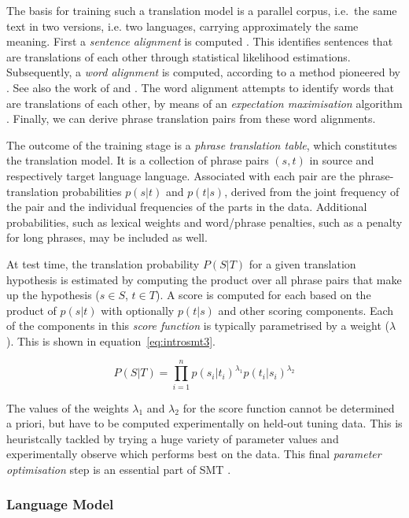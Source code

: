 The basis for training such a translation model is a parallel corpus, i.e.\ the
same text in two versions, i.e. two languages, carrying approximately the same meaning. First a \emph{sentence alignment} is computed
\citep{TIEDEMANN}. This identifies sentences that are translations of each other
through statistical likelihood estimations. Subsequently, a \emph{word alignment} is computed,
according to a method pioneered by \cite{BROWN}. See also the work of
\cite{OchNey2003} and \cite{TIEDEMANN}. The word alignment attempts to
identify words that are translations of each other, by means of an
\emph{expectation maximisation} algorithm \citep{EXPMAX}. Finally, we can derive phrase
translation pairs from these word alignments.

The outcome of the training stage is a \emph{phrase translation table}, which
constitutes the translation model. It is a collection of phrase pairs $(s,t)$
in source and respectively target language language. Associated with each pair
are the phrase-translation probabilities $p(s|t)$ and $p(t|s)$, derived from
the joint frequency of the pair and the individual frequencies of the parts in
the data. Additional probabilities, such as lexical weights and word/phrase
penalties, such as a penalty for long phrases, may be included as well.

At test time, the translation probability $P(S|T)$ for a given translation
hypothesis is estimated by computing the product over all phrase pairs that
make up the hypothesis ($s \in S$, $t \in T$). A score is computed for each
based on the product of $p(s|t)$ with optionally $p(t|s)$ and other scoring
components. Each of the components in this \emph{score function}
is typically parametrised by a weight ($\lambda$). This is shown in equation~\ref{eq:introsmt3}.

\begin{equation}
P(S|T) = \prod_{i=1}^{n} p(s_i|t_i)^{\lambda_1} p(t_i|s_i)^{\lambda_2}
\label{eq:introsmt3}
\end{equation}

The values of the weights $\lambda_1$ and $\lambda_2$ for the score function cannot be determined a priori,
but have to be computed experimentally on held-out tuning data. This is heuristcally tackled by trying a huge variety of parameter values and experimentally
observe which performs best on the data.  This final \emph{parameter
optimisation} step is an essential part of SMT \citep{MERT}.

\subsubsection{Language Model}

